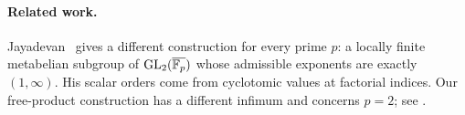 
\paragraph{Related work.}
Jayadevan~\cite{jayadevan-21-121a} gives a different construction
for every prime \(p\): a locally finite metabelian subgroup of
\(\operatorname{GL}_2(\overline{\mathbb F_p})\) whose admissible exponents are exactly
\((1,\infty)\). His scalar orders come from cyclotomic values at
factorial indices. Our free-product construction has a different
infimum and concerns \(p=2\); see \comparisonlocation{}.
